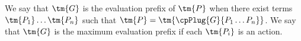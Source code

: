 \begin{definition}\label{def:cp-maximum-evaluation-prefix}
  We say that $\tm{G}$ is the evaluation prefix of $\tm{P}$ when there exist terms
  $\tm{P_1} \dots \tm{P_n}$ such that $\tm{P} = \tm{\cpPlug{G}{P_1 \dots P_n}}$.
  We say that $\tm{G}$ is the maximum evaluation prefix if each $\tm{P_i}$ is an
  action. 
\end{definition}
